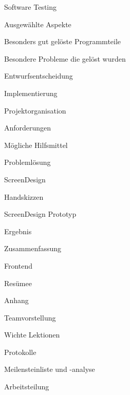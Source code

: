 \begin{compactenum}
\begin{compactenum}
        \item Software Testing \big [ W \big ]
    \end{compactenum}
    \item Ausgewählte Aspekte \big [ R \& W \big ]
    \begin{compactenum}
        \item Besonders gut gelöste Programmteile \big [ R \& W \big ]
        \item Besondere Probleme die gelöst wurden \big [ R \& W \big ]
        \item Entwurfsentscheidung \big [ R \& W \big ]
    \end{compactenum}
    \item Implementierung \big [ W \big ]
    \item Projektorganisation \big [ R \big ]
    \begin{compactenum}
        \item Anforderungen \big [ R \big ]
        \item Mögliche Hilfsmittel \big [ R \big ]
        \item Problemlösung \big [ R \big ]
    \end{compactenum}
    \item ScreenDesign \big [ R \big ]
    \item \begin{compactenum}
        \item Handskizzen \big [ R \big ]
        \item ScreenDesign Prototyp \big [ R \big ]
    \end{compactenum}
    \item Ergebnis \big [ R \big ]
    \item \begin{compactenum}
        \item Zusammenfassung \big [ R \big ]
        \item Frontend \big [ R \big ]
    \end{compactenum}
    \item Resümee \big [ R \& W \big ]
    \item Anhang \big [ R \& W \big ]
    \begin{compactenum}
        \item Teamvorstellung \big [ R \& W \big ]
        \item Wichte Lektionen \big [ R \& W \big ]
        \item Protokolle \big [ R \big ]
        \item Meilensteinliste und -analyse \big [ R \big ]
        \item Arbeitsteilung \big [ R \& W \big ]
    \end{compactenum}
\end{compactenum}